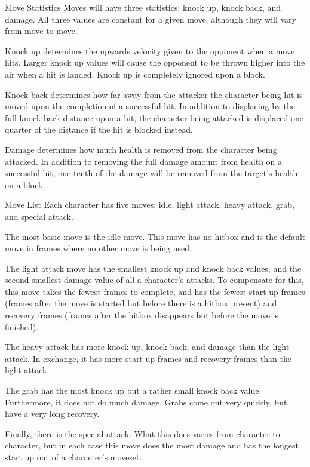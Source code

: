 \documentclass[12pt]{report}
\begin{document}
\begin{section}{Move Statistics}
Moves will have three statistics: knock up, knock back, and damage. All three
values are constant for a given move, although they will vary from move to
move.

Knock up determines the upwards velocity given to the opponent when a move hits.
Larger knock up values will cause the opponent to be thrown higher into the air
when a hit is landed. Knock up is completely ignored upon a block.

Knock back determines how far away from the attacker the character being hit is
moved upon the completion of a successful hit. In addition to displacing by the
full knock back distance upon a hit, the character being attacked is displaced
one quarter of the distance if the hit is blocked instead.

Damage determines how much health is removed from the character being attacked.
In addition to removing the full damage amount from health on a successful hit,
one tenth of the damage will be removed from the target's health on a block.
\end{section}

\begin{section}{Move List}
Each character has five moves: idle, light attack, heavy attack, grab, and
special attack.

The most basic move is the idle move. This move has no hitbox and is the default
move in frames where no other move is being used.

The light attack move has the smallest knock up and knock back values, and the second smallest damage value of all a character's attacks. To compensate for
this, this move takes the fewest frames to complete, and has the fewest start up
frames (frames after the move is started but before there is a hitbox present)
and recovery frames (frames after the hitbox disappears but before the move is
finished).

The heavy attack has more knock up, knock back, and damage than the light
attack. In exchange, it has more start up frames and recovery frames than the
light attack.

The grab has the most knock up but a rather small knock back value. Furthermore,
it does not do much damage. Grabs come out very quickly, but have a very long
recovery.

Finally, there is the special attack. What this does varies from character to
character, but in each case this move does the most damage and has the longest
start up out of a character's moveset.
\end{section}
\end{document}
